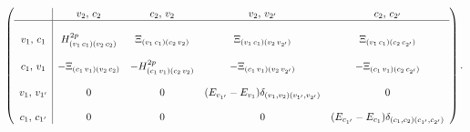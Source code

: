 \documentclass[11pt]{article}
\begin{document}
\begin{displaymath}
\left(\begin{array}{c | c c c c}
                   &  {v_{2},\,c_{2}} & {c_{2},\,v_{2}} & {v_{2},\,v_{2^{\prime}}} & {c_{2},\,c_{2^{\prime}}} \\
\hline
                   & & & & \\
{v_{1},\,c_{1}}     &  H^{2p}_{(v_{1}\,c_{1})(v_{2}\,c_{2})} & \Xi_{(v_{1}\,c_{1})(c_{2}\,v_{2})} &
                      \Xi_{(v_{1}\,c_{1})(v_{2}\,v_{2^{\prime}})}         & \Xi_{(v_{1}\,c_{1})(c_{2}\,c_{2^{\prime}})} \\
                   & & & & \\
{c_{1},\,v_{1}}     & -\Xi_{(c_{1}\,v_{1})(v_{2}\,c_{2})} & -H^{2p}_{(c_{1}\,v_{1})(c_{2}\,v_{2})} &
                     -\Xi_{(c_{1}\,v_{1})(v_{2}\,v_{2^{\prime}})}          & -\Xi_{(c_{1}\,v_{1})(c_{2}\,c_{2^{\prime}})} \\
                   & & & & \\
{v_{1},\,v_{1^{\prime}}} &           0                                     & 0                                   &
                     (E_{v_{1^{\prime}}} - E_{v_{1}})\delta_{(v_{1},v_{2})(v_{1^{\prime}},v_{2^{\prime}})} & 0\\
                   & & & & \\
{c_{1},\,c_{1^{\prime}}} &            0                                     & 0                                   &
                                0 & (E_{c_{1^{\prime}}} - E_{c_{1}})\delta_{(c_{1},c_{2})(c_{1^{\prime}},c_{2^{\prime}})}
\end{array}\right).
\end{displaymath}
\end{document}
